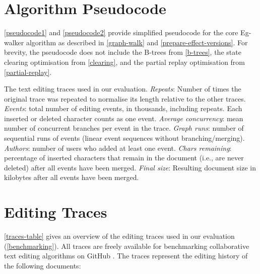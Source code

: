 \documentclass[sigplan,10pt]{acmart}
\newcommand{\algname}{Eg-walker\xspace}
\begin{document}
\newpage
\section{Algorithm Pseudocode}

\autoref{pseudocode1} and \autoref{pseudocode2} provide simplified pseudocode for the core \algname algorithm as described in \autoref{graph-walk} and \ref{prepare-effect-versions}.
For brevity, the pseudocode does not include the B-trees from \autoref{b-trees}, the state clearing optimisation from \autoref{clearing}, and the partial replay optimisation from \autoref{partial-replay}.

\begin{table}
  \caption{The text editing traces used in our evaluation.
    \emph{Repeats}: Number of times the original trace was repeated to normalise its length relative to the other traces.
    \emph{Events}: total number of editing events, in thousands, including repeats. Each inserted or deleted character counts as one event.
    \emph{Average concurrency}: mean number of concurrent branches per event in the trace.
    \emph{Graph runs}: number of sequential runs of events (linear event sequences without branching/merging).
    \emph{Authors}: number of users who added at least one event.
    \emph{Chars remaining}: percentage of inserted characters that remain in the document (i.e., are never deleted) after all events have been merged.
    \emph{Final size}: Resulting document size in kilobytes after all events have been merged.
  }
  \label{traces-table}
  \footnotesize
\end{table}

\clearpage
\section{Editing Traces}\label{traces-appendix}

\autoref{traces-table} gives an overview of the editing traces used in our evaluation (\autoref{benchmarking}).
All traces are freely available for benchmarking collaborative text editing algorithms on GitHub \cite{editing-traces}.
The traces represent the editing history of the following documents:
\end{document}
